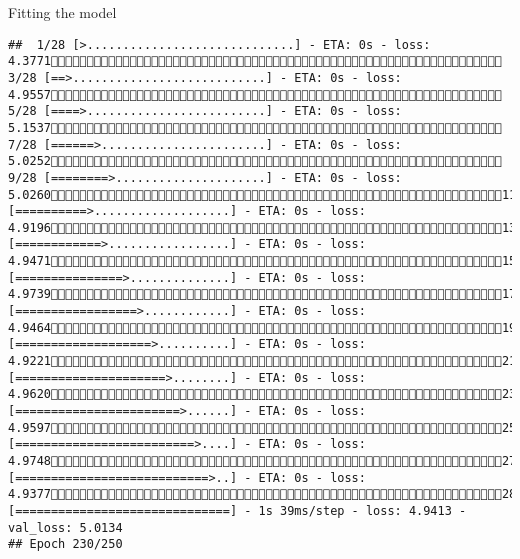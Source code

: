 \documentclass[
  ignorenonframetext,
]{beamer}
\begin{document}
\begin{frame}[fragile]{Fitting the model}
\begin{verbatim}
##  1/28 [>.............................] - ETA: 0s - loss: 4.3771 3/28 [==>...........................] - ETA: 0s - loss: 4.9557 5/28 [====>.........................] - ETA: 0s - loss: 5.1537 7/28 [======>.......................] - ETA: 0s - loss: 5.0252 9/28 [========>.....................] - ETA: 0s - loss: 5.026011/28 [==========>...................] - ETA: 0s - loss: 4.919613/28 [============>.................] - ETA: 0s - loss: 4.947115/28 [===============>..............] - ETA: 0s - loss: 4.973917/28 [=================>............] - ETA: 0s - loss: 4.946419/28 [===================>..........] - ETA: 0s - loss: 4.922121/28 [=====================>........] - ETA: 0s - loss: 4.962023/28 [=======================>......] - ETA: 0s - loss: 4.959725/28 [=========================>....] - ETA: 0s - loss: 4.974827/28 [===========================>..] - ETA: 0s - loss: 4.937728/28 [==============================] - 1s 39ms/step - loss: 4.9413 - val_loss: 5.0134
## Epoch 230/250

\end{verbatim}
\end{frame}
\end{document}
